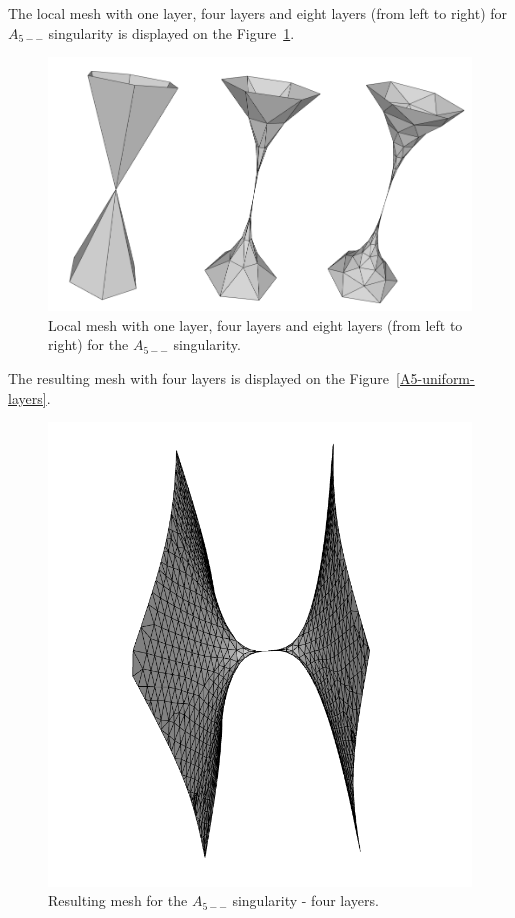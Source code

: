 The local mesh with one layer, four layers and eight layers (from left to right) 
for $A_{5--}$ singularity is displayed
on the Figure~\ref{img:53}. 
\begin{figure}
    \centerline{\includegraphics[scale=0.4]{images/img53}}
    \caption[Local mesh with layers for the $A_{5--}$ singularity]
    {Local mesh with one layer, four layers and eight layers (from left to right) 
    for the $A_{5--}$ singularity.}
    \label{img:53}
\end{figure}

The resulting mesh with four layers is displayed on the
Figure~\ref{A5-uniform-layers}.
\begin{figure}
    \centerline{\includegraphics[scale=0.25]{images/A5-uniform-layers}}
    \caption[Resulting mesh for the $A_{5--}$ singularity]
    {Resulting mesh for the $A_{5--}$ singularity - four layers.}
    \label{img:A5-uniform-layers}
\end{figure}

